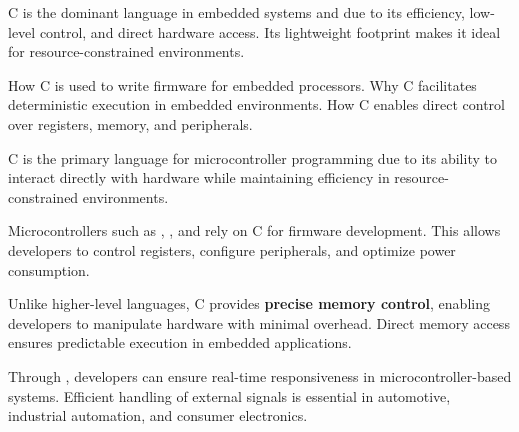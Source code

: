 \begin{NxSSSBox}
	\begin{NxIDBox}
		C is the dominant language in embedded systems and  due to its efficiency, low-level control, and direct hardware access. Its lightweight footprint makes it ideal for resource-constrained environments.
	\end{NxIDBox}
	\begin{NxIDBoxL}
		 How C is used to write firmware for embedded processors.
		 Why C facilitates deterministic execution in embedded environments.
		 How C enables direct control over registers, memory, and peripherals.
	\end{NxIDBoxL}
\end{NxSSSBox}

\begin{NxSSSSBox}
	\begin{NxIDBox}
		C is the primary language for microcontroller programming due to its ability to interact directly with hardware while maintaining efficiency in resource-constrained environments.
	\end{NxIDBox}
	\begin{NxIDBox}
	Microcontrollers such as , , and  rely on C for firmware development. This allows developers to control registers, configure peripherals, and optimize power consumption.
	\end{NxIDBox}
	\begin{NxIDBox}
		Unlike higher-level languages, C provides \textbf{precise memory control}, enabling developers to manipulate hardware with minimal overhead. Direct memory access ensures predictable execution in embedded applications.
	\end{NxIDBox}
	\begin{NxIDBox}
		Through , developers can ensure real-time responsiveness in microcontroller-based systems. Efficient handling of external signals is essential in automotive, industrial automation, and consumer electronics.
	\end{NxIDBox}
\end{NxSSSSBox}

